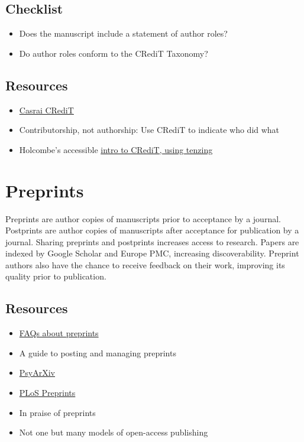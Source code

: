 \documentclass[
  oneside]{book}
\providecommand{\tightlist}{%
  \setlength{\itemsep}{0pt}\setlength{\parskip}{0pt}}
\begin{document}
\hypertarget{checklist-5}{%
\section{Checklist}\label{checklist-5}}

\begin{itemize}
\tightlist
\item
  Does the manuscript include a statement of author roles?
\item
  Do author roles conform to the CRediT Taxonomy?
\end{itemize}

\hypertarget{resources-4}{%
\section{Resources}\label{resources-4}}

\begin{itemize}
\tightlist
\item
  \href{https://casrai.org/credit/}{Casrai CRediT}
\item
  Contributorship, not authorship: Use CRediT to indicate who did what \citep{holcombe2019contributorship}
\item
  Holcombe's accessible \href{https://alexholcombe.medium.com/announcing-tenzing-ceca6789d88c}{intro to CRediT, using tenzing}
\end{itemize}

\hypertarget{preprints}{%
\chapter{Preprints}\label{preprints}}

Preprints are author copies of manuscripts prior to acceptance by a journal. Postprints are author copies of manuscripts after acceptance for publication by a journal. Sharing preprints and postprints increases access to research. Papers are indexed by Google Scholar and Europe PMC, increasing discoverability. Preprint authors also have the chance to receive feedback on their work, improving its quality prior to publication.

\hypertarget{resources-5}{%
\section{Resources}\label{resources-5}}

\begin{itemize}
\tightlist
\item
  \href{http://blog.psyarxiv.com/2016/09/19/psyarxiv-faq/}{FAQs about preprints}
\item
  A guide to posting and managing preprints \citep{moshontz2021guide}
\item
  \href{https://psyarxiv.com/}{PsyArXiv}
\item
  \href{https://plos.org/open-science/preprints/}{PLoS Preprints}
\item
  In praise of preprints \citep{fry2019praise}
\item
  Not one but many models of open-access publishing \citep{condon2020not}
\end{itemize}
\end{document}
